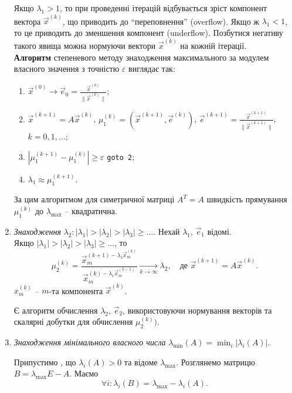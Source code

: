 \documentclass[12pt, a4paper]{article}
\theoremstyle{definition}
\renewcommand{\epsilon}{\varepsilon}
\numberwithin{equation}{section}
\begin{document}
\begin{enumerate}
	Якщо $\lambda_1 > 1$, то при проведенні ітерацій відбувається зріст компонент вектора $\vec x^{(k)}$, що приводить до ``переповнення'' (overflow). Якщо ж $\lambda_1 < 1$, то це приводить до зменшення компонент (underflow). Позбутися негативу такого явища можна нормуючи вектори $\vec x^{(k)}$ на кожній ітерації. \\

	\textbf{Алгоритм} степеневого методу знаходження максимального за модулем власного значення з точністю $\epsilon$ виглядає так:
	\begin{enumerate}
		\item $\vec x^{(0)} \to \vec e_0 = \frac{\vec x^{(0)}}{\|\vec x^{(0)}\|}$;

		\item $\vec x^{(k+1)} = A \vec x^{(k)}$, $\mu_1^{(k)} = (\vec x^{(k+1)}, \vec e^{(k)})$, $\vec e^{(k+1)} = \frac{\vec x^{(k+1)}}{\|\vec x^{(k+1)}\|}$, $k = 0,1,\ldots$;

		\item $|\mu_1^{(k+1)} - \mu_1^{(k)}| \ge \epsilon$ \verb|goto 2|;

		\item $\lambda_1 \approx \mu_1^{(k+1)}$.
	\end{enumerate}

	За цим алгоритмом для симетричної матриці $A^T = A$ швидкість прямування $\mu_1^{(k)}$ до $\lambda_{\max}$ -- квадратична.

	\item \textit{Знаходження} $\lambda_2: |\lambda_1| > |\lambda_2| > |\lambda_3| \ge \ldots$. Нехай $\lambda_1$, $\vec e_1$ відомі. \\

	Якщо $|\lambda_1| > |\lambda_2| > |\lambda_3| \ge \ldots$, то
		\[ \mu_2^{(k)} = \dfrac{\vec x_m^{(k+1) - \lambda_1 \vec x_m^{(k)}}}{\vec x_m^{(k) - \lambda_1 \vec x_m^{(k-1)}}} \xrightarrow[k\to\infty]{} \lambda_2, \quad \text{де } \vec x^{(k+1)} = A \vec x^{(k)}. \]
		$x_m^{(k)}$ -- $m$-та компонента $\vec x^{(k)}$.

	Є алгоритм обчислення $\lambda_2$, $\vec e_2$, використовуючи нормування векторів та скалярні добутки для обчислення $\mu_2^{(k)})$.


	\item \textit{Знаходження мінімального власного числа} $\lambda_{\min}(A) = \min_i |\lambda_i(A)|$.

	Припустимо , що $\lambda_i(A) > 0$ та відоме $\lambda_{\max}$. Розглянемо матрицю $B = \lambda_{\max} E - A$. Маємо \[ \forall i: \lambda_i(B) = \lambda_{\max} - \lambda_i(A). \]


\end{enumerate}
\end{document}

